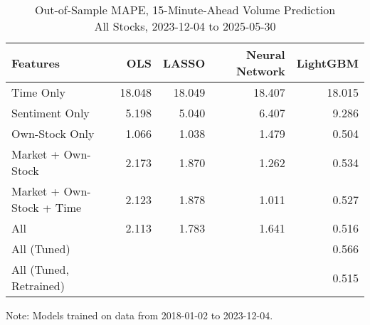 \begin{table}[H]
\caption{
{ Out-of-Sample MAPE, 15-Minute-Ahead Volume Prediction} \\
{\small All Stocks, 2023-12-04 to 2025-05-30}
} 

\fontsize{12.0pt}{14.4pt}\selectfont

\begin{tabular*}{\linewidth}{@{\extracolsep{\fill}}lrrrr}
\toprule
Features & OLS & LASSO & Neural Network & LightGBM \\ 
\midrule\addlinespace[2.5pt]
Time Only & 18.048 & 18.049 & 18.407 & 18.015 \\
Sentiment Only & 5.198 & 5.040 & 6.407 & 9.286 \\
Own-Stock Only & 1.066 & 1.038 & 1.479 & 0.504 \\
Market + Own-Stock & 2.173 & 1.870 & 1.262 & 0.534 \\
Market + Own-Stock + Time & 2.123 & 1.878 & 1.011 & 0.527 \\
All & 2.113 & 1.783 & 1.641 & 0.516 \\
All (Tuned) &  &  &  & 0.566 \\
All (Tuned, Retrained) &  &  &  & 0.515 \\
\bottomrule
\end{tabular*}
\begin{minipage}{\linewidth}
Note: Models trained on data from 2018-01-02 to 2023-12-04.\\
\end{minipage}
\end{table}
